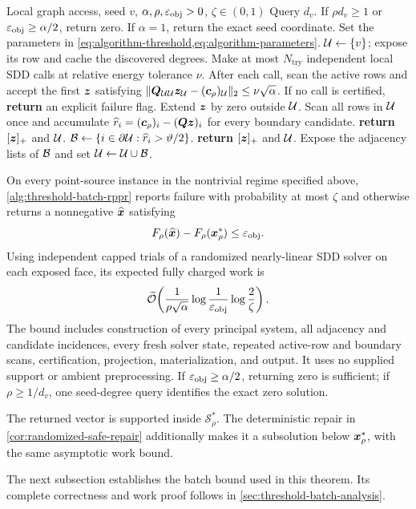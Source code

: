 \begin{algorithm}[htbp]
\caption{Threshold-batch local RPPR solver}
\label{alg:threshold-batch-rppr}
\begin{algorithmic}[1]
\REQUIRE Local graph access, seed $v$, $\alpha,\rho,\varepsilon_{\mathrm{obj}}>0$, $\zeta\in(0,1)$
\STATE Query $d_v$. If $\rho d_v\geq1$ or $\varepsilon_{\mathrm{obj}}\geq\alpha/2$, return zero.
\STATE If $\alpha=1$, return the exact seed coordinate.
\STATE Set the parameters in \cref{eq:algorithm-threshold,eq:algorithm-parameters}.
\STATE $\mathcal{U}\gets\{v\}$; expose its row and cache the discovered degrees.
  \STATE Make at most $N_{\mathrm{try}}$ independent local SDD calls at relative energy
         tolerance $\nu$.  After each call, scan the active rows and accept
         the first $\bm{z}$ satisfying
         $\lVert\bm{Q}_{\mathcal{U}\mathcal{U}}\bm{z}_{\mathcal{U}}-(\bm{c}_\rho)_{\mathcal{U}}\rVert_2\leq\nu\sqrt\alpha$.
  \STATE If no call is certified, \textbf{return} an explicit failure flag.
  \STATE Extend $\bm{z}$ by zero outside $\mathcal{U}$.
  \STATE Scan all rows in $\mathcal{U}$ once and accumulate
         $\widehat r_i=(\bm{c}_\rho)_i-(\bm{Q}\bm{z})_i$ for every boundary candidate.
    \STATE \textbf{return} $[\bm{z}]_+$ and $\mathcal{U}$.
  \ENDIF
  \STATE $\mathcal{B}\gets\{i\in\partial \mathcal{U}:\widehat r_i>\vartheta/2\}$.
  \IF{$\gB=\emptyset$}
    \STATE \textbf{return} $[\bm{z}]_+$ and $\mathcal{U}$.
  \ENDIF
  \STATE Expose the adjacency lists of $\mathcal{B}$ and set $\mathcal{U}\gets \mathcal{U}\cup \mathcal{B}$.
\ENDFOR
\end{algorithmic}
\end{algorithm}
\FloatBarrier

\begin{theorem}
\label{thm:local-rppr}
On every point-source instance in the nontrivial regime specified above,
\cref{alg:threshold-batch-rppr} reports failure with probability at most
$\zeta$ and otherwise returns a nonnegative $\widehat{\bm{x}}$ satisfying
\begin{equation}
 F_\rho(\widehat{\bm{x}})-F_\rho(\bm{x}_\rho^*)\leq\varepsilon_{\mathrm{obj}}.
 \label{eq:local-rppr-gap}
\end{equation}
Using independent capped trials of a randomized nearly-linear SDD solver on
each exposed face, its expected fully charged work is
\begin{equation}
 \widetilde{\mathcal{O}}\!\left(
   \frac{1}{\rho\sqrt\alpha}
   \log\frac1{\varepsilon_{\mathrm{obj}}}\log\frac2\zeta
 \right).
 \label{eq:local-rppr-work}
\end{equation}
The bound includes construction of every principal system, all adjacency and
candidate incidences, every fresh solver state, repeated active-row and
boundary scans, certification, projection, materialization, and output.  It
uses no supplied support or ambient preprocessing.  If
$\varepsilon_{\mathrm{obj}}\geq\alpha/2$, returning zero is sufficient; if
$\rho\geq1/d_v$, one seed-degree query identifies the exact zero solution.
\end{theorem}

The returned vector is supported inside $\mathcal S_\rho^*$.
The deterministic repair in \cref{cor:randomized-safe-repair} additionally
makes it a subsolution below $\bm{x}_\rho^*$, with the same asymptotic work bound.

The next subsection establishes the batch bound used in this theorem.
Its complete correctness and work proof follows in
\cref{sec:threshold-batch-analysis}.
